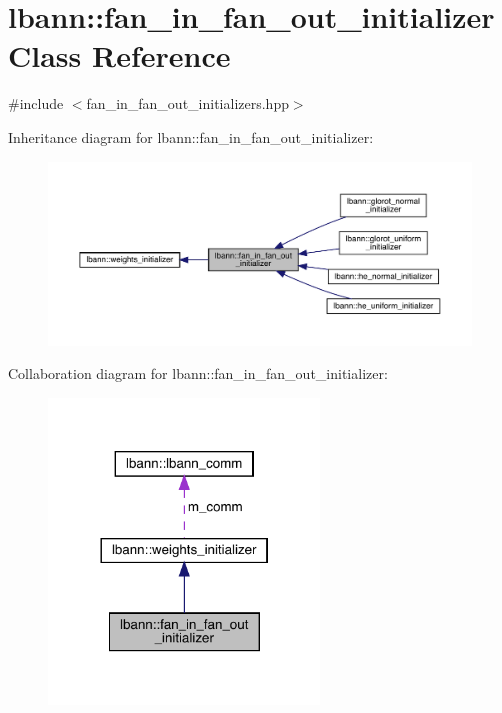 \hypertarget{classlbann_1_1fan__in__fan__out__initializer}{}\section{lbann\+:\+:fan\+\_\+in\+\_\+fan\+\_\+out\+\_\+initializer Class Reference}
\label{classlbann_1_1fan__in__fan__out__initializer}


{\ttfamily \#include $<$fan\+\_\+in\+\_\+fan\+\_\+out\+\_\+initializers.\+hpp$>$}



Inheritance diagram for lbann\+:\+:fan\+\_\+in\+\_\+fan\+\_\+out\+\_\+initializer\+:\nopagebreak
\begin{figure}[H]
\begin{center}
\leavevmode
\includegraphics[width=350pt]{classlbann_1_1fan__in__fan__out__initializer__inherit__graph}
\end{center}
\end{figure}


Collaboration diagram for lbann\+:\+:fan\+\_\+in\+\_\+fan\+\_\+out\+\_\+initializer\+:\nopagebreak
\begin{figure}[H]
\begin{center}
\leavevmode
\includegraphics[width=204pt]{classlbann_1_1fan__in__fan__out__initializer__coll__graph}
\end{center}
\end{figure}
